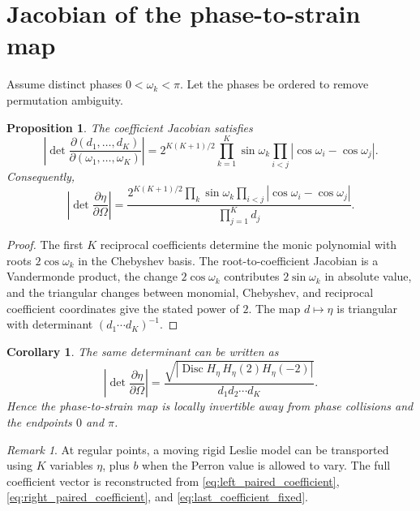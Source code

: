 \documentclass[11pt]{amsart}
\numberwithin{equation}{section}
\theoremstyle{plain}
\newtheorem{proposition}[theorem]{Proposition}
\newtheorem{corollary}[theorem]{Corollary}
\theoremstyle{definition}
\theoremstyle{remark}
\newtheorem{remark}[theorem]{Remark}
\begin{document}
\section{Jacobian of the phase-to-strain map}
\label{sec:eta_jacobian}

Assume distinct phases $0<\omega_k<\pi$.  Let the phases be ordered to remove permutation ambiguity.

\begin{proposition}
\label{prop:d_jacobian}
The coefficient Jacobian satisfies
\begin{equation}
\left|
\det\frac{\partial(d_1,\ldots,d_K)}
{\partial(\omega_1,\ldots,\omega_K)}
\right|
=
2^{K(K+1)/2}
\prod_{k=1}^{K}\sin\omega_k
\prod_{i<j}|\cos\omega_i-\cos\omega_j|.
\label{eq:d_jacobian}
\end{equation}
Consequently,
\begin{equation}
\left|
\det\frac{\partial\eta}{\partial\Omega}
\right|
=
\frac{
2^{K(K+1)/2}
\displaystyle\prod_k\sin\omega_k
\displaystyle\prod_{i<j}|\cos\omega_i-\cos\omega_j|
}{\displaystyle\prod_{j=1}^{K}d_j}.
\label{eq:eta_jacobian}
\end{equation}
\end{proposition}

\begin{proof}
The first $K$ reciprocal coefficients determine the monic polynomial with roots $2\cos\omega_k$ in the Chebyshev basis.  The root-to-coefficient Jacobian is a Vandermonde product, the change $2\cos\omega_k$ contributes $2\sin\omega_k$ in absolute value, and the triangular changes between monomial, Chebyshev, and reciprocal coefficient coordinates give the stated power of $2$.  The map $d\mapsto\eta$ is triangular with determinant $(d_1\cdots d_K)^{-1}$.
\end{proof}

\begin{corollary}
\label{cor:discriminant_jacobian}
The same determinant can be written as
\begin{equation}
\left|
\det\frac{\partial\eta}{\partial\Omega}
\right|
=
\frac{
\sqrt{\left|
\operatorname{Disc}H_\eta\,
H_\eta(2)H_\eta(-2)
\right|}
}{d_1d_2\cdots d_K}.
\label{eq:eta_jacobian_discriminant}
\end{equation}
Hence the phase-to-strain map is locally invertible away from phase collisions and the endpoints $0$ and $\pi$.
\end{corollary}

\begin{remark}
\label{rem:reduced_transport_coordinates}
At regular points, a moving rigid Leslie model can be transported using $K$ variables $\eta$, plus $b$ when the Perron value is allowed to vary.  The full coefficient vector is reconstructed from \eqref{eq:left_paired_coefficient}, \eqref{eq:right_paired_coefficient}, and \eqref{eq:last_coefficient_fixed}.
\end{remark}
\end{document}
